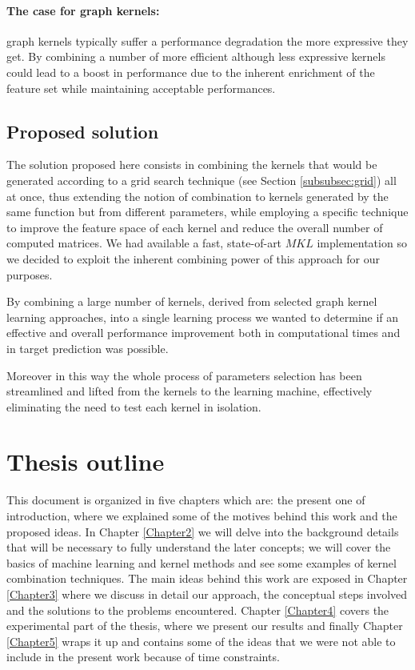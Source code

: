 \paragraph{The case for graph kernels:} graph kernels typically suffer a performance
degradation the more expressive they get. By combining a number of more efficient although
less expressive kernels could lead to a boost in performance due to the inherent enrichment
of the feature set while maintaining acceptable performances.

\subsection{Proposed solution}

The solution proposed here consists in combining the kernels that would be
generated according to a grid search technique (see Section \ref{subsubsec:grid})
all at once, thus extending the notion of combination to kernels generated by the same
function but from different parameters, while employing a specific technique to
improve the feature space of each kernel and reduce the overall number of computed
matrices.
We had available a fast, state-of-art $MKL$ implementation \cite{aiolli2015easymkl}
so we decided to exploit the inherent combining power of this approach for our
purposes.

By combining a large number of kernels, derived from selected graph kernel
learning approaches, into a single learning process we wanted to determine if an
effective and overall performance improvement both in computational times and 
in target prediction was possible.

Moreover in this way the whole process of parameters selection has been streamlined and
lifted from the kernels to the learning machine, effectively eliminating the need to test each
kernel in isolation.


\section{Thesis outline}
This document is organized in five chapters which are: the present one of introduction,
where we explained some of the motives behind this work and the proposed ideas.
In Chapter \ref{Chapter2} we will delve into the background details that will be
necessary to fully understand the later concepts; we will cover the basics of
machine learning and kernel methods and see some examples of kernel combination
techniques.
The main ideas behind this work are exposed in Chapter \ref{Chapter3} where we
discuss in detail our approach, the conceptual steps involved and the solutions
to the problems encountered.
Chapter \ref{Chapter4} covers the experimental part of the thesis, where we present
our results and finally Chapter \ref{Chapter5} wraps it up and contains some of the
ideas that we were not able to include in the present work because of time constraints.



